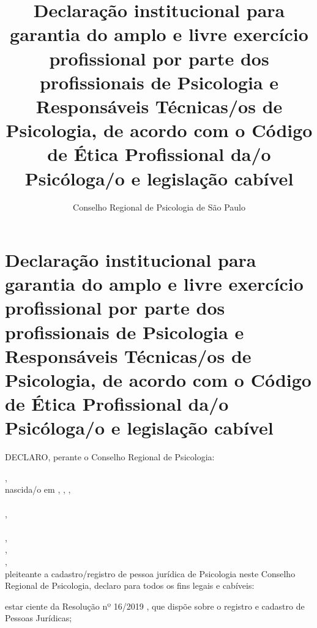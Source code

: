 \documentclass[openright, oneside, a4paper, article, 10pt, brazil]{abntex2}
\title{Declaração institucional para garantia do amplo e livre exercício profissional por parte dos profissionais de Psicologia e Responsáveis Técnicas/os de Psicologia, de acordo com o Código de Ética Profissional da/o Psicóloga/o e legislação cabível}
\author{Conselho Regional de Psicologia de São Paulo}
\begin{document}
\pagestyle{crp}
\centering
\Form
\setasuspacing{\DoubleSpacing}\centering

\setasuspacing{\OnehalfSpacing}

\section{Declaração institucional para garantia do amplo e livre exercício profissional por parte dos profissionais de Psicologia e Responsáveis Técnicas/os de Psicologia, de acordo com o Código de Ética Profissional da/o Psicóloga/o e legislação cabível}%
\setasuspacing{\DoubleSpacing}\justifying
\vspace*{0.5\baselineskip}

DECLARO, perante o Conselho Regional de Psicologia:
\vspace*{\baselineskip}

 \hfill,\\
nascida/o em  ,  ,  ,\\
 \\
 ,\\
\\
 ,\\
 , \\
 ,\\
pleiteante a cadastro/registro de pessoa jurídica de Psicologia neste Conselho Regional de Psicologia, declaro para todos os fins legais e cabíveis:
\vspace{\baselineskip}

\setasuspacing{\OnehalfSpacing}
\begin{minipage}[c]{\boxlarg}
\CheckBox[%
    name=ciente_resolucao,
    bordercolor=black,
    height=12pt,
    width=12pt]
    {\null}
\end{minipage}%
\begin{minipage}[c]{\linewidth-1.72\boxlarg}
    estar ciente da Resolução nº 16/2019 , que dispõe sobre o registro e cadastro de Pessoas Jurídicas;
\end{minipage}\vspace{\baselineskip}
\end{document}
